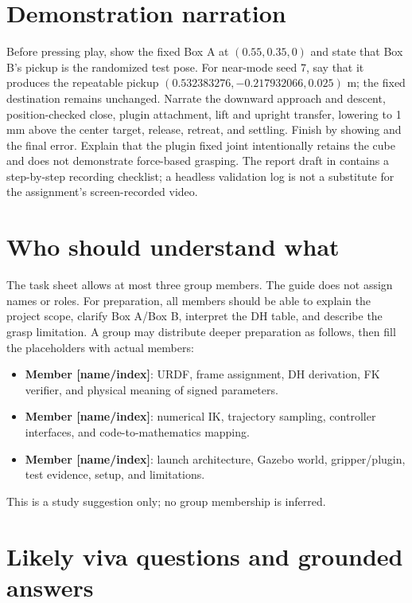 \section{Demonstration narration}
Before pressing play, show the fixed Box A at $(0.55,0.35,0)$ and state that
Box B's pickup is the randomized test pose. For near-mode seed 7, say that it
produces the repeatable pickup $(0.532383276,-0.217932066,0.025)$ m; the fixed
destination remains unchanged. Narrate the downward approach and descent,
position-checked close, plugin attachment, lift and upright transfer, lowering
to 1 mm above the center target, release, retreat, and settling. Finish by
showing  and the final error. Explain that the
plugin fixed joint intentionally retains the cube and does not demonstrate
force-based grasping. The report draft in  contains a
step-by-step recording checklist; a headless validation log is not a substitute
for the assignment's screen-recorded video.

\section{Who should understand what}
The task sheet allows at most three group members. The guide does not assign
names or roles. For preparation, all members should be able to explain the
project scope, clarify Box A/Box B, interpret the DH table, and describe the
grasp limitation. A group may distribute deeper preparation as follows, then
fill the placeholders with actual members:
\begin{itemize}
 \item \textbf{Member [name/index]}: URDF, frame assignment, DH derivation,
 FK verifier, and physical meaning of signed parameters.
 \item \textbf{Member [name/index]}: numerical IK, trajectory sampling,
 controller interfaces, and code-to-mathematics mapping.
 \item \textbf{Member [name/index]}: launch architecture, Gazebo world,
 gripper/plugin, test evidence, setup, and limitations.
\end{itemize}
This is a study suggestion only; no group membership is inferred.

\section{Likely viva questions and grounded answers}
